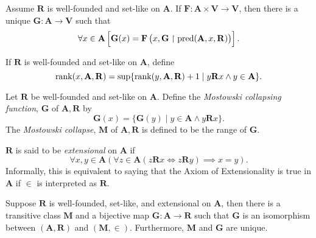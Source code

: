 \begin{theorem}
    Assume $\mathbf R$ is well-founded and set-like on $\mathbf A$. If $\mathbf F: \mathbf A\times\mathbf V\to\mathbf V$, then there is a unique $\mathbf G:\mathbf A\to\mathbf V$ such that 
    \begin{equation*}
        \forall x\in\mathbf A\left[\mathbf G(x) = \mathbf F\left(x, \mathbf G\upharpoonright\operatorname{pred}(\mathbf A, x,\mathbf R)\right)\right].
    \end{equation*}
\end{theorem}

\begin{definition}
    If $\mathbf R$ is well-founded and set-like on $\mathbf A$, define 
    \begin{equation*}
        \operatorname{rank}(x,\mathbf A,\mathbf R) = \sup\{\operatorname{rank}(y,\mathbf A,\mathbf R) + 1\mid y\mathbf R x\wedge y\in\mathbf A\}.
    \end{equation*}
\end{definition}

\begin{definition}
    Let $\mathbf R$ be well-founded and set-like on $\mathbf A$. Define the \emph{Mostowski collapsing function}, $\mathbf G$ of $\mathbf A, \mathbf R$ by 
    \begin{equation*}
        \mathbf G(x) = \{\mathbf G(y)\mid y\in\mathbf A\wedge y\mathbf R x\}.
    \end{equation*}
    The \emph{Mostowski collapse}, $\mathbf M$ of $\mathbf A,\mathbf R$ is defined to be the range of $\mathbf G$.
\end{definition}

\begin{definition}
    $\mathbf R$ is said to be \emph{extensional} on $\mathbf A$ if 
    \begin{equation*}
        \forall x,y\in\mathbf A\left(\forall z\in\mathbf A\left(z\mathbf R x\iff z\mathbf R y\right)\implies x = y\right).
    \end{equation*}
    Informally, this is equivalent to saying that the Axiom of Extensionality is true in $\mathbf A$ if $\in$ is interpreted as $\mathbf R$.
\end{definition}

\begin{theorem}
    Suppose $\mathbf R$ is well-founded, set-like, and extensional on $\mathbf A$, then there is a transitive class $\mathbf M$ and a bijective map $\mathbf G: \mathbf A\to\mathbf R$ such that $\mathbf G$ is an isomorphism between $(\mathbf A,\mathbf R)$ and $(\mathbf M,\in)$. Furthermore, $\mathbf M$ and $\mathbf G$ are unique.
\end{theorem}